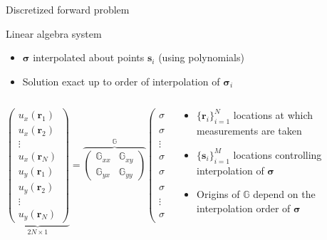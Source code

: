 \documentclass[presentation,aspectratio=169]{beamer}
\newcommand{\br}{\mathbf{r}}
\newcommand{\bs}{\mathbf{s}}
\begin{document}
\begin{frame}{Discretized forward problem}
 \small
\begin{block}{Linear algebra system}
\begin{itemize}
\item $\boldsymbol\sigma$ interpolated about points $\bs_i$ (using polynomials)
\item Solution exact up to order of interpolation of $\boldsymbol\sigma_i$
\end{itemize}
\begin{columns}
\begin{column}{0.6\textwidth}
\[
\underbrace{\left(\begin{matrix} 
u_{x}({\br_1} )\\
u_x({\br_2} ) \\
\vdots \\
u_x({\br_N} ) \\
u_{y}({\br_1} )\\
u_y({\br_2} ) \\
\vdots \\
u_y({\br_N} )
\end{matrix}\right)}_{2N\times1} =
\overbrace{\left(\begin{matrix}
\mathbb{G}_{xx} & \mathbb{G}_{xy} \\
\mathbb{G}_{yx} & \mathbb{G}_{yy}
\end{matrix}\right)}^{\mathbb{G}}
\underbrace{\left(\begin{matrix} 
\sigma_{xz}({\bs_1} )\\
\sigma_{xz}({\bs_2} ) \\
\vdots \\
\sigma_{xz}({\bs_M} ) \\
\sigma_{yz}({\bs_1} )\\
\sigma_{yz}({\bs_2} ) \\
\vdots \\
\sigma_{yz}({\bs_M} )
\end{matrix}\right)}_{2M\times1} 
\]
\end{column}
\begin{column}{0.4\textwidth}
\begin{itemize}
\item $\{\mathbf{r}_i\}_{i=1}^N$  locations at which measurements are taken
\item $\{\mathbf{s}_i\}_{i=1}^M$  locations controlling interpolation of $\boldsymbol\sigma$
\item Origins of $\mathbb{G}$ depend on the interpolation order of $\boldsymbol\sigma$
\end{itemize}
\end{column}
\end{columns}
\end{block}
\end{frame}
\end{document}
